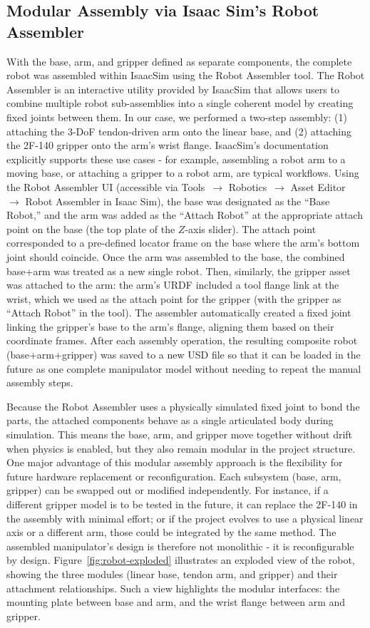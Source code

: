 \subsection{Modular Assembly via Isaac Sim's Robot Assembler}\label{subsec:assembly}

With the base, arm, and gripper defined as separate components, the complete robot was assembled within IsaacSim using the Robot Assembler tool. The Robot Assembler is an interactive utility provided by IsaacSim that allows users to combine multiple robot sub-assemblies into a single coherent model by creating fixed joints between them. In our case, we performed a two-step assembly: (1) attaching the 3-\ac{DoF} tendon-driven arm onto the linear base, and (2) attaching the 2F-140 gripper onto the arm's wrist flange. IsaacSim's documentation explicitly supports these use cases - for example, assembling a robot arm to a moving base, or attaching a gripper to a robot arm, are typical workflows\cite{IsaacSimDoc}. Using the Robot Assembler UI (accessible via Tools~$\to$ Robotics~$\to$ Asset Editor~$\to$ Robot Assembler in Isaac Sim), the base was designated as the ``Base Robot,'' and the arm was added as the ``Attach Robot'' at the appropriate attach point on the base (the top plate of the $Z$-axis slider). The attach point corresponded to a pre-defined locator frame on the base where the arm's bottom joint should coincide. Once the arm was assembled to the base, the combined base+arm was treated as a new single robot. Then, similarly, the gripper asset was attached to the arm: the arm's \ac{URDF} included a tool flange link at the wrist, which we used as the attach point for the gripper (with the gripper as ``Attach Robot'' in the tool). The assembler automatically created a fixed joint linking the gripper's base to the arm's flange, aligning them based on their coordinate frames. After each assembly operation, the resulting composite robot (base+arm+gripper) was saved to a new \ac{USD} file so that it can be loaded in the future as one complete manipulator model without needing to repeat the manual assembly steps.

Because the Robot Assembler uses a physically simulated fixed joint to bond the parts, the attached components behave as a single articulated body during simulation. This means the base, arm, and gripper move together without drift when physics is enabled, but they also remain modular in the project structure. One major advantage of this modular assembly approach is the flexibility for future hardware replacement or reconfiguration. Each subsystem (base, arm, gripper) can be swapped out or modified independently. For instance, if a different gripper model is to be tested in the future, it can replace the 2F-140 in the assembly with minimal effort; or if the project evolves to use a physical linear axis or a different arm, those could be integrated by the same method. The assembled manipulator's design is therefore not monolithic - it is reconfigurable by design. Figure~\ref{fig:robot-exploded} illustrates an exploded view of the robot, showing the three modules (linear base, tendon arm, and gripper) and their attachment relationships. Such a view highlights the modular interfaces: the mounting plate between base and arm, and the wrist flange between arm and gripper.

